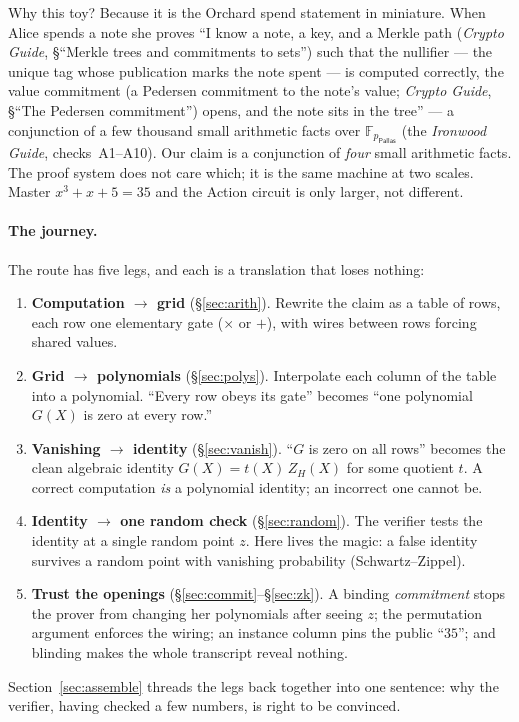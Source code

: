 \documentclass[11pt,a4paper]{article}
\theoremstyle{definition}
\newcommand{\F}{\mathbb{F}}
\newcommand{\ZH}{Z_H}
\begin{document}
Why this toy? Because it is the Orchard spend statement in miniature. When Alice
spends a note she proves ``I know a note, a key, and a Merkle path (\emph{Crypto
Guide}, \S``Merkle trees and commitments to sets'') such that
the nullifier --- the unique tag whose publication marks the note spent ---
is computed correctly, the value commitment (a Pedersen commitment to the note's
value; \emph{Crypto Guide}, \S``The Pedersen commitment'') opens, and the note sits in the
tree'' --- a conjunction of a few thousand small arithmetic facts
over $\F_{p_{\mathsf{Pallas}}}$ (the \emph{Ironwood Guide}, checks~A1--A10). Our claim is
a conjunction of \emph{four} small arithmetic facts. The proof system does not
care which; it is the same machine at two scales. Master $x^3 + x + 5 = 35$ and
the Action circuit is only larger, not different.

\paragraph{The journey.} The route has five legs, and each is a translation
that loses nothing:
\begin{enumerate}[leftmargin=*,itemsep=1pt]
\item \textbf{Computation $\to$ grid} (\S\ref{sec:arith}). Rewrite the claim as
a table of rows, each row one elementary gate ($\times$ or $+$), with wires
between rows forcing shared values.
\item \textbf{Grid $\to$ polynomials} (\S\ref{sec:polys}). Interpolate each
column of the table into a polynomial. ``Every row obeys its gate'' becomes
``one polynomial $G(X)$ is zero at every row.''
\item \textbf{Vanishing $\to$ identity} (\S\ref{sec:vanish}). ``$G$ is zero on
all rows'' becomes the clean algebraic identity $G(X) = t(X)\,\ZH(X)$ for some
quotient $t$. A correct computation \emph{is} a polynomial identity; an
incorrect one cannot be.
\item \textbf{Identity $\to$ one random check} (\S\ref{sec:random}). The
verifier tests the identity at a single random point $z$. Here lives the
magic: a false identity survives a random point with vanishing probability
(Schwartz--Zippel).
\item \textbf{Trust the openings} (\S\ref{sec:commit}--\S\ref{sec:zk}). A
binding \emph{commitment} stops the prover from changing her polynomials after
seeing $z$; the permutation argument enforces the wiring; an instance column
pins the public ``$35$''; and blinding makes the whole transcript reveal
nothing.
\end{enumerate}
Section~\ref{sec:assemble} threads the legs back together into one sentence:
why the verifier, having checked a few numbers, is right to be convinced.
\end{document}
